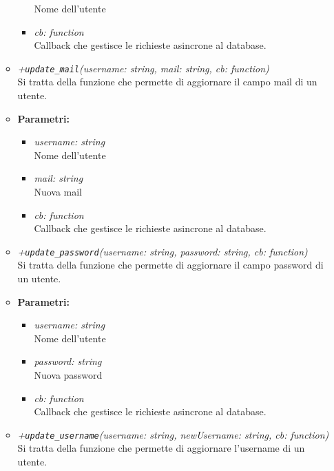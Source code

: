 \begin{itemize}
\begin{itemize}
\begin{itemize}
              Nome dell'utente
              \item \emph{cb: function}\\
              Callback che gestisce le richieste asincrone al database.
            \end{itemize}
            \item \emph{+\texttt{update\_mail}(username: string, mail: string, cb: function)}\\
            Si tratta della funzione che permette di aggiornare il campo mail di un utente.\\
            \item \textbf{Parametri: }
            \begin{itemize}
              \item \emph{username: string}\\
              Nome dell'utente
              \item \emph{mail: string}\\
              Nuova mail
              \item \emph{cb: function}\\
              Callback che gestisce le richieste asincrone al database.
            \end{itemize}
            \item \emph{+\texttt{update\_password}(username: string, password: string, cb: function)}\\
            Si tratta della funzione che permette di aggiornare il campo password di un utente.\\
            \item \textbf{Parametri: }
            \begin{itemize}
              \item \emph{username: string}\\
              Nome dell'utente
              \item \emph{password: string}\\
              Nuova password
              \item \emph{cb: function}\\
              Callback che gestisce le richieste asincrone al database.
            \end{itemize}
            \item \emph{+\texttt{update\_username}(username: string, newUsername: string, cb: function)}\\
            Si tratta della funzione che permette di aggiornare l'username di un utente.\\

\end{itemize}
\end{itemize}
